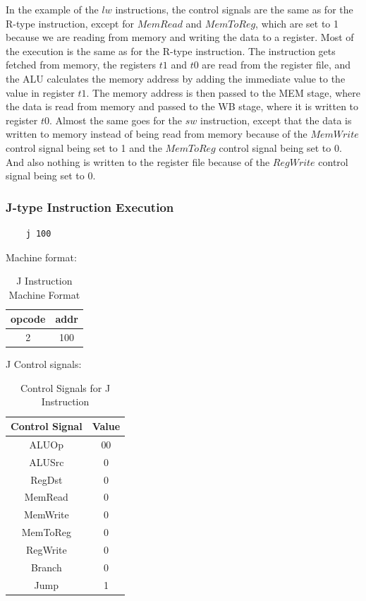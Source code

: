 In the example of the $lw$ instructions, the control signals are the same as for the R-type instruction, except for $MemRead$ and $MemToReg$, which are set to 1 because we are reading from memory and writing the data to a register. Most of the execution is the same as for the R-type instruction.
The instruction gets fetched from memory, the registers $t1$ and $t0$ are read from the register file, and the ALU calculates the memory address by adding the immediate value to the value in register $t1$. The memory address is then passed to the MEM stage, where the data is read from memory and passed to the WB stage, where it is written to register $t0$.
Almost the same goes for the $sw$ instruction, except that the data is written to memory instead of being read from memory because of the $MemWrite$ control signal being set to 1 and the $MemToReg$ control signal being set to 0. And also nothing is written to the register file because of the $RegWrite$ control signal being set to 0.

\subsubsection{J-type Instruction Execution}
\begin{verbatim}
    j 100
\end{verbatim}

Machine format:
\begin{table}[H]
    \centering
    \begin{tabular}{|c|c|}
    \hline
    \textbf{opcode} & \textbf{addr} \\ \hline
    2             & 100          \\ \hline
    \end{tabular}
    \caption{J Instruction Machine Format}
    \label{tab:j_instruction}
\end{table}

J Control signals:
\begin{table}[H]
    \centering
    \begin{tabular}{|c|c|}
    \hline
    \textbf{Control Signal} & \textbf{Value} \\ \hline
    ALUOp                   & 00             \\ \hline
    ALUSrc                  & 0             \\ \hline
    RegDst                  & 0             \\ \hline
    MemRead                 & 0             \\ \hline
    MemWrite                & 0             \\ \hline
    MemToReg                & 0             \\ \hline
    RegWrite                & 0             \\ \hline
    Branch                  & 0             \\ \hline
    Jump                 & 1             \\ \hline
    \end{tabular}
    \caption{Control Signals for J Instruction}
    \label{tab:j_control_signals}
\end{table}

